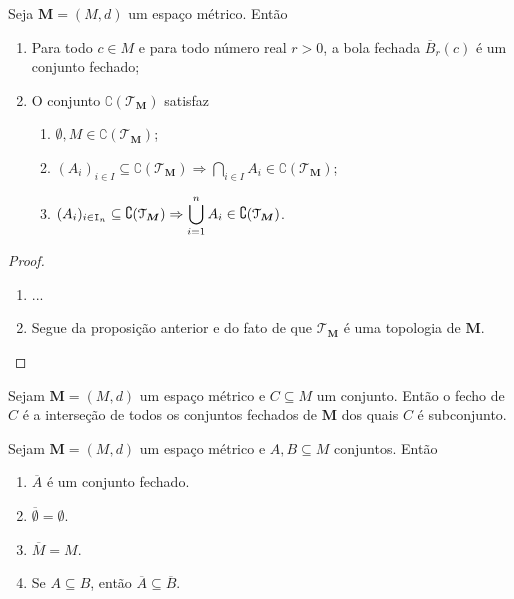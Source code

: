 \begin{prop}
	Seja $\bm M = (M,d)$ um espaço métrico. Então
	\begin{enumerate}
	\item Para todo $c \in M$ e para todo número real $r > 0$, a bola fechada $\overline B_r(c)$ é um conjunto fechado;
	\item O conjunto $\complement(\mathcal T_{\bm M})$ satisfaz
		\begin{enumerate}
			\item $\emptyset,M \in \complement(\mathcal T_{\bm M})$;
			\item $(A_i)_{i \in I} \subseteq \complement(\mathcal T_{\bm M}) \Rightarrow \displaystyle\bigcap_{i \in I} A_i \in \complement(\mathcal T_{\bm M})$;
			\item $(A_i)_{i \in \mathtt I_n} \subseteq \complement(\mathcal T_{\bm M}) \Rightarrow \displaystyle\bigcup_{i=1}^n A_i \in \complement(\mathcal T_{\bm M})$.
		\end{enumerate}
	\end{enumerate}
\end{prop}
\begin{proof}
	\begin{enumerate}
	\item ...
	
	\item Segue da proposição anterior e do fato de que $\mathcal T_{\bm M}$ é uma topologia de $\bm M$.
	\end{enumerate}
\end{proof}

\begin{prop}
	Sejam $\bm M = (M,d)$ um espaço métrico e $C \subseteq M$ um conjunto. Então o fecho de $C$ é a interseção de todos os conjuntos fechados de $\bm M$ dos quais $C$ é subconjunto.
\end{prop}

\begin{prop}
	Sejam $\bm M = (M,d)$ um espaço métrico e $A,B \subseteq M$ conjuntos. Então
	\begin{enumerate}
	\item $\overline A$ é um conjunto fechado.
	\item $\overline \emptyset = \emptyset$.
	\item $\overline M = M$.
	\item Se $A \subseteq B$, então $\overline A \subseteq \overline B$.
	\end{enumerate}
\end{prop}

